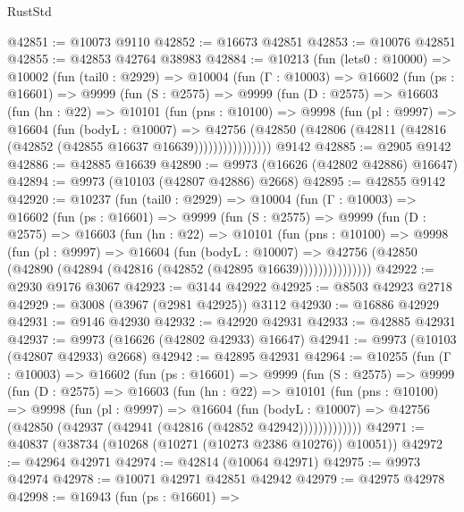\begin{lexlean}{RustStd}
\begin{coremodule}
@42851 := @10073 @9110
@42852 := @16673 @42851
@42853 := @10076 @42851
@42855 := @42853 @42764 @38983
@42884 := @10213
    (fun (lets0 : @10000) =>
    @10002
      (fun (tail0 : @2929) =>
      @10004
        (fun (Γ : @10003) =>
        @16602
          (fun (ps : @16601) =>
          @9999
            (fun (S : @2575) =>
            @9999
              (fun (D : @2575) =>
              @16603
                (fun (hn : @22) =>
                @10101
                  (fun (pns : @10100) =>
                  @9998
                    (fun (pl : @9997) =>
                    @16604
                      (fun (bodyL : @10007) =>
                      @42756
                        (@42850
                          (@42806 (@42811 (@42816 (@42852 (@42855 @16637 @16639))))))))))))))))
    @9142
@42885 := @2905 @9142
@42886 := @42885 @16639
@42890 := @9973 (@16626 (@42802 @42886) @16647)
@42894 := @9973 (@10103 (@42807 @42886) @2668)
@42895 := @42855 @9142
@42920 := @10237
    (fun (tail0 : @2929) =>
    @10004
      (fun (Γ : @10003) =>
      @16602
        (fun (ps : @16601) =>
        @9999
          (fun (S : @2575) =>
          @9999
            (fun (D : @2575) =>
            @16603
              (fun (hn : @22) =>
              @10101
                (fun (pns : @10100) =>
                @9998
                  (fun (pl : @9997) =>
                  @16604
                    (fun (bodyL : @10007) =>
                    @42756 (@42850 (@42890 (@42894 (@42816 (@42852 (@42895 @16639)))))))))))))))
@42922 := @2930 @9176 @3067
@42923 := @3144 @42922
@42925 := @8503 @42923 @2718
@42929 := @3008 (@3967 (@2981 @42925)) @3112
@42930 := @16886 @42929
@42931 := @9146 @42930
@42932 := @42920 @42931
@42933 := @42885 @42931
@42937 := @9973 (@16626 (@42802 @42933) @16647)
@42941 := @9973 (@10103 (@42807 @42933) @2668)
@42942 := @42895 @42931
@42964 := @10255
    (fun (Γ : @10003) =>
    @16602
      (fun (ps : @16601) =>
      @9999
        (fun (S : @2575) =>
        @9999
          (fun (D : @2575) =>
          @16603
            (fun (hn : @22) =>
            @10101
              (fun (pns : @10100) =>
              @9998
                (fun (pl : @9997) =>
                @16604
                  (fun (bodyL : @10007) =>
                  @42756 (@42850 (@42937 (@42941 (@42816 (@42852 @42942)))))))))))))
@42971 := @40837 (@38734 (@10268 (@10271 (@10273 @2386 @10276)) @10051))
@42972 := @42964 @42971
@42974 := @42814 (@10064 @42971)
@42975 := @9973 @42974
@42978 := @10071 @42971 @42851 @42942
@42979 := @42975 @42978
@42998 := @16943
    (fun (ps : @16601) =>

\end{coremodule}
\end{lexlean}

